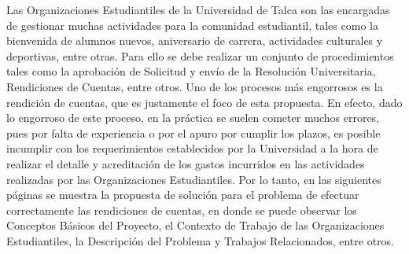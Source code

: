 Las Organizaciones Estudiantiles de la Universidad de Talca son las encargadas de gestionar muchas actividades para la comunidad estudiantil, tales como la bienvenida de alumnos nuevos, aniversario de carrera, actividades culturales y deportivas, entre otras. Para ello se debe realizar un conjunto de procedimientos tales como la aprobación de Solicitud y envío de la Resolución Universitaria, Rendiciones de Cuentas, entre otros. Uno de los procesos más engorrosos es la rendición de cuentas, que es justamente el foco de esta propuesta. En efecto, dado lo engorroso de este proceso, en la práctica se suelen cometer muchos errores, pues por falta de experiencia o por el apuro por cumplir los plazos, es posible incumplir con los requerimientos establecidos por la Universidad a la hora de realizar el detalle y acreditación de los gastos incurridos en las actividades realizadas por las Organizaciones Estudiantiles. Por lo tanto, en las siguientes páginas se muestra la propuesta de solución para el problema de efectuar correctamente las rendiciones de cuentas, en donde se puede observar los Conceptos Básicos del Proyecto, el Contexto de Trabajo de las Organizaciones Estudiantiles, la Descripción del Problema y Trabajos Relacionados, entre otros.